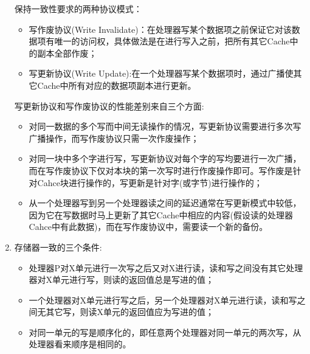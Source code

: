 \documentclass[a4paper]{ctexbook}
\begin{document}
\begin{enumerate}
{  保持一致性要求的两种协议模式：
  \begin{itemize}
    \item 写作废协议(Write Invalidate)：在处理器写某个数据项之前保证它对该数据项有唯一的访问权，具体做法是在进行写入之前，把所有其它Cache中的副本全部作废；
    \item 写更新协议(Write Update):在一个处理器写某个数据项时，通过广播使其它Cache中所有对应的数据项副本进行更新。
  \end{itemize}
  写更新协议和写作废协议的性能差别来自三个方面:
  \begin{itemize}
    \item 对同一数据的多个写而中间无读操作的情况，写更新协议需要进行多次写广播操作，而写作废协议只需一次作废操作；
    \item 对同一块中多个字进行写，写更新协议对每个字的写均要进行一次广播，而在写作废协议下仅对本块的第一次写时进行作废操作即可。写作废是针对Cahce块进行操作的，写更新是针对字(或字节)进行操作的；
    \item 从一个处理器写到另一个处理器读之间的延迟通常在写更新模式中较低，因为它在写数据时马上更新了其它Cache中相应的内容(假设读的处理器Cahce中有此数据)，而在写作废协议中，需要读一个新的备份。
  \end{itemize}}
  
  \item {\color{grey}存储器一致的三个条件:
  \begin{itemize}
    \item 处理器P对X单元进行一次写之后又对X进行读，读和写之间没有其它处理器对X单元进行写，则读的返回值总是写进的值；
    \item 一个处理器对X单元进行写之后，另一个处理器对X单元进行读，读和写之间无其它写，则读X单元的返回值应为写进的值；
    \item 对同一单元的写是顺序化的，即任意两个处理器对同一单元的两次写，从处理器看来顺序是相同的。
  \end{itemize}}
  
\end{enumerate}
\end{document}
